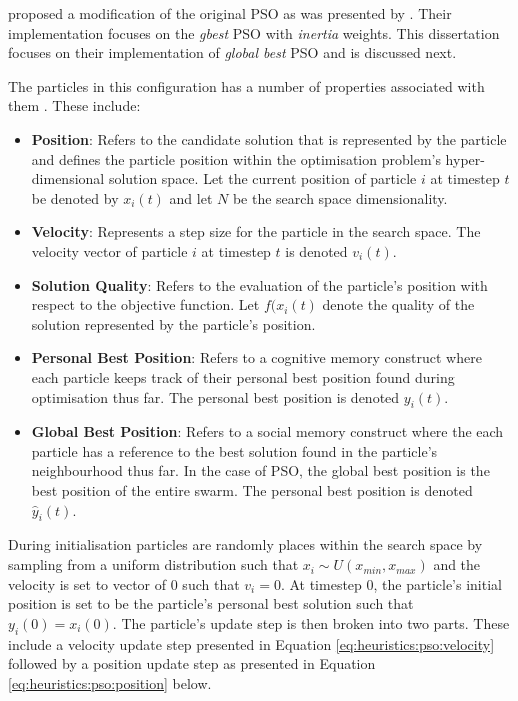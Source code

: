 \citeauthor{ref:shi:1998}\cite{ref:shi:1998} proposed a modification of the original \ac{PSO} as was presented by \citeauthor{ref:kennedy:1995}. Their implementation focuses on the \textit{gbest} \ac{PSO} with \textit{inertia} weights. This dissertation focuses on their implementation of \textit{global best} \ac{PSO} and is discussed next.

The particles in this configuration has a number of properties associated with them \cite{ref:vanwyk:2014}. These include:

\begin{itemize}
      \item \textbf{Position}: Refers to the candidate solution that is represented by the particle and defines the particle position within the optimisation problem's hyper-dimensional solution space. Let the current position of particle $i$ at timestep $t$ be denoted by $x_{i}(t)$ and let $N$ be the search space dimensionality.
      \item \textbf{Velocity}: Represents a step size for the particle in the search space. The velocity vector of particle $i$ at timestep $t$ is denoted $v_{i}(t)$.
      \item \textbf{Solution Quality}: Refers to the evaluation of the particle's position with respect to the objective function. Let $f(x_{i}(t)$ denote the quality of the solution represented by the particle's position.
      \item \textbf{Personal Best Position}: Refers to a cognitive memory construct where each particle keeps track of their personal best position found during optimisation thus far. The personal best position is denoted $y_{i}(t)$.
      \item \textbf{Global Best Position}: Refers to a social memory construct where the each particle has a reference to the best solution found in the particle's neighbourhood thus far. In the case of  \ac{PSO}, the global best position is the best position of the entire swarm. The personal best position is denoted $\hat{y}_{i}(t)$.
\end{itemize}

During initialisation particles are randomly places within the search space by sampling from a uniform distribution such that $x_{i} \sim U(x_{min}, x_{max})$ and the velocity is set to vector of 0 such that $v_{i} = 0$. At timestep 0, the particle's initial position is set to be the particle's personal best solution such that $y_{i}(0) = x_{i}(0)$. The particle's update step is then broken into two parts. These include a velocity update step presented in Equation \ref{eq:heuristics:pso:velocity} followed by a position update step as presented in Equation \ref{eq:heuristics:pso:position} below.

